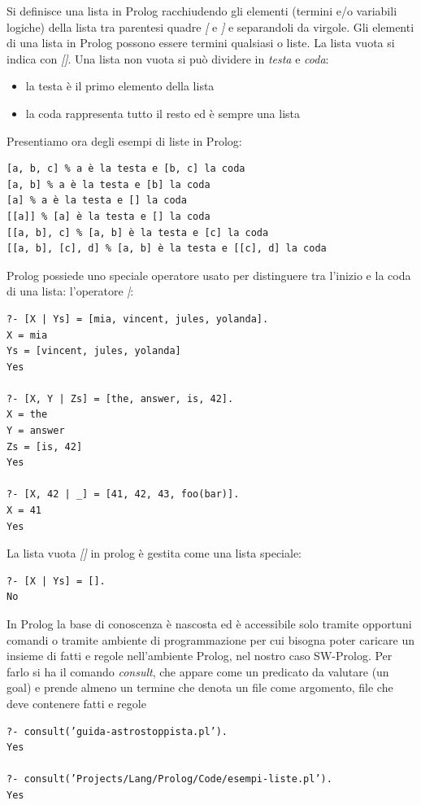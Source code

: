 \documentclass[a4paper]{report}
\begin{document}


Si definisce una lista in Prolog racchiudendo gli elementi (termini e/o variabili logiche) della lista tra parentesi quadre \textit{[} e \textit{]}
e separandoli da virgole. Gli elementi di una lista in Prolog possono essere termini
qualsiasi o liste. La lista vuota si indica con \textit{[]}.
Una lista non vuota si può dividere in \textit{testa} e \textit{coda}:
\begin{itemize}
\item la testa è il primo elemento della lista
\item la coda rappresenta tutto il resto ed è sempre una lista
\end{itemize}
Presentiamo ora degli esempi di liste in Prolog:
\begin{verbatim}
[a, b, c] % a è la testa e [b, c] la coda
[a, b] % a è la testa e [b] la coda
[a] % a è la testa e [] la coda
[[a]] % [a] è la testa e [] la coda
[[a, b], c] % [a, b] è la testa e [c] la coda
[[a, b], [c], d] % [a, b] è la testa e [[c], d] la coda
\end{verbatim}
Prolog possiede uno speciale operatore usato per distinguere tra l'inizio e la coda di una lista: l'operatore \textit{|}:
\begin{verbatim}
?- [X | Ys] = [mia, vincent, jules, yolanda].
X = mia
Ys = [vincent, jules, yolanda]
Yes

?- [X, Y | Zs] = [the, answer, is, 42].
X = the
Y = answer
Zs = [is, 42]
Yes

?- [X, 42 | _] = [41, 42, 43, foo(bar)].
X = 41
Yes
\end{verbatim}
La lista vuota \textit{[]} in prolog è gestita come una lista speciale:
\begin{verbatim}
?- [X | Ys] = [].
No
\end{verbatim}

In Prolog la base di conoscenza è nascosta ed è accessibile solo tramite opportuni comandi o tramite ambiente di programmazione
per cui bisogna poter caricare un insieme di fatti e regole nell'ambiente Prolog, nel nostro caso SW-Prolog.
Per farlo si ha il comando \textit{consult}, che appare come un predicato da valutare (un goal) e prende almeno un termine che denota un file
come argomento, file che deve contenere fatti e regole
\begin{verbatim}
?- consult(’guida-astrostoppista.pl’).
Yes

?- consult(’Projects/Lang/Prolog/Code/esempi-liste.pl’).
Yes
\end{verbatim}
\end{document}
